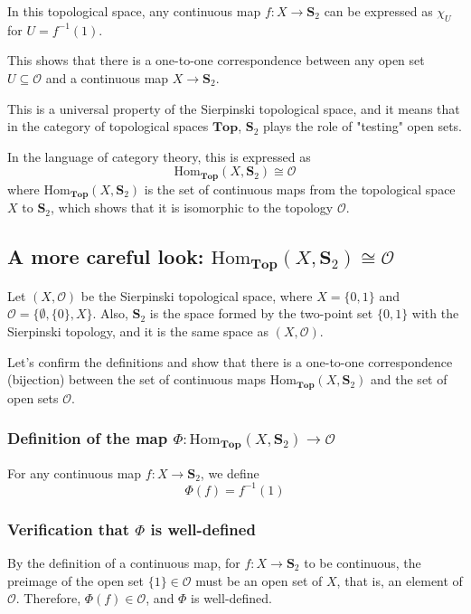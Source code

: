 \documentclass{article}
\begin{document}
In this topological space, any continuous map $f: X \to \mathbf{S}_ {2}$ can be expressed as $\chi_{U}$ for $U = f^{-1}(1)$.

This shows that there is a one-to-one correspondence between any open set $U \subseteq \mathcal{O}$ and a continuous map $X \to \mathbf{S}_ {2}$.

This is a universal property of the Sierpinski topological space, and it means that in the category of topological spaces $\mathbf{Top}$, $\mathbf{S}_ {2}$ plays the role of "testing" open sets.

In the language of category theory, this is expressed as
$$
	\mathrm{Hom}_{\mathbf{Top}}(X, \mathbf{S}_ {2}) \cong \mathcal{O}
$$
where $\mathrm{Hom}_{\mathbf{Top}}(X, \mathbf{S}_ {2})$ is the set of continuous maps from the topological space $X$ to $\mathbf{S}_ {2}$, which shows that it is isomorphic to the topology $\mathcal{O}$.


\subsection{\texorpdfstring{A more careful look: $\mathrm{Hom}_{\mathbf{Top}}(X, \mathbf{S}_ {2}) \cong \mathcal{O}$}{A more careful look: Hom(X, S2) is isomorphic to O}}

Let $(X, \mathcal{O})$ be the Sierpinski topological space, where $X = \{0, 1\}$ and $\mathcal{O} = \{\emptyset, \{0\}, X\}$.
Also, $\mathbf{S}_ {2}$ is the space formed by the two-point set $\{0, 1\}$ with the Sierpinski topology, and it is the same space as $(X, \mathcal{O})$.

Let's confirm the definitions and show that there is a one-to-one correspondence (bijection) between the set of continuous maps $\mathrm{Hom}_{\mathbf{Top}}(X, \mathbf{S}_ {2})$ and the set of open sets $\mathcal{O}$.

\subsubsection*{Definition of the map $\Phi: \mathrm{Hom}_{\mathbf{Top}}(X, \mathbf{S}_ {2}) \to \mathcal{O}$}

For any continuous map $f: X \to \mathbf{S}_ {2}$, we define
$$ \Phi(f) = f^{-1}(1) $$
\subsubsection*{Verification that $\Phi$ is well-defined}

By the definition of a continuous map, for $f: X \to \mathbf{S}_ {2}$ to be continuous, the preimage of the open set $\{1\} \in \mathcal{O}$ must be an open set of $X$, that is, an element of $\mathcal{O}$.
Therefore, $\Phi(f) \in \mathcal{O}$, and $\Phi$ is well-defined.
\end{document}
